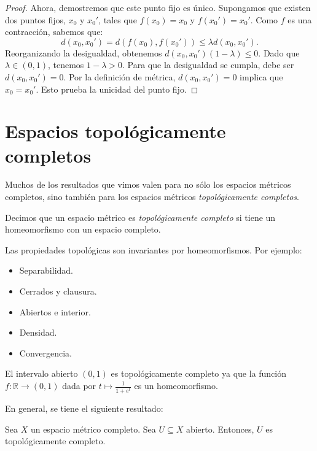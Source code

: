 \begin{proof}
	Ahora, demostremos que este punto fijo es único.
	Supongamos que existen dos puntos fijos, $x_0$ y $x_0'$, tales que $f(x_0) = x_0$ y $f(x_0') = x_0'$.
	Como $f$ es una contracción, sabemos que:
	$$d(x_0, x_0') = d(f(x_0), f(x_0')) \le \lambda d(x_0, x_0').$$
	Reorganizando la desigualdad, obtenemos $d(x_0, x_0') (1 - \lambda) \le 0$.
	Dado que $\lambda \in (0,1)$, tenemos $1 - \lambda > 0$. Para que la desigualdad se cumpla, debe ser $d(x_0, x_0') = 0$.
	Por la definición de métrica, $d(x_0, x_0') = 0$ implica que $x_0 = x_0'$. Esto prueba la unicidad del punto fijo.
\end{proof}


\section{Espacios topológicamente completos}

Muchos de los resultados que vimos valen para no sólo los espacios métricos completos, sino también para los espacios métricos \textit{topológicamente completos}.

\begin{definition}
	Decimos que un espacio métrico es \emph{topológicamente completo} si tiene un homeomorfismo con un espacio completo.
\end{definition}

Las propiedades topológicas son invariantes por homeomorfismos. Por ejemplo:
\begin{itemize}
	\item Separabilidad.
	\item Cerrados y clausura.
	\item Abiertos e interior.
	\item Densidad.
	\item Convergencia.
\end{itemize}

\begin{example}
	El intervalo abierto $(0, 1)$ es topológicamente completo ya que la función $f : \mathbb{R} \to (0, 1)$ dada por $t \mapsto \frac{1}{1 + e^t}$ es un homeomorfismo.
\end{example}

En general, se tiene el siguiente resultado:

\begin{proposition}
	Sea $X$ un espacio métrico completo. Sea $U \subseteq X$ abierto. Entonces, $U$ es topológicamente completo.
\end{proposition}

